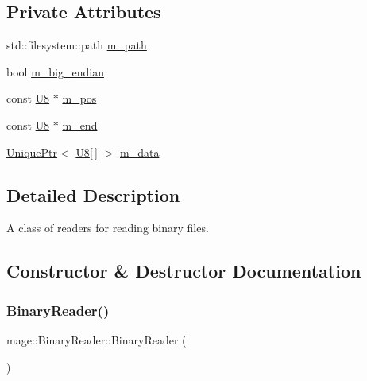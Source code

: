 \subsection*{Private Attributes}
\begin{DoxyCompactItemize}
\item 
std\+::filesystem\+::path \mbox{\hyperlink{classmage_1_1_binary_reader_a0941e624c8386fee2e2e92c6d1efdb75}{m\+\_\+path}}
\item 
bool \mbox{\hyperlink{classmage_1_1_binary_reader_a8d23fde958e08efe248edb5d92861113}{m\+\_\+big\+\_\+endian}}
\item 
const \mbox{\hyperlink{namespacemage_a30677c03d683c4c35630c25f6ff3fb7f}{U8}} $\ast$ \mbox{\hyperlink{classmage_1_1_binary_reader_aedb9632de1cf95d5af49499217744ed5}{m\+\_\+pos}}
\item 
const \mbox{\hyperlink{namespacemage_a30677c03d683c4c35630c25f6ff3fb7f}{U8}} $\ast$ \mbox{\hyperlink{classmage_1_1_binary_reader_a19b0f36cb1e8a05aaa9471514242e8ef}{m\+\_\+end}}
\item 
\mbox{\hyperlink{namespacemage_a3316d7143a973e37adf1110f2e80ca31}{Unique\+Ptr}}$<$ \mbox{\hyperlink{namespacemage_a30677c03d683c4c35630c25f6ff3fb7f}{U8}}\mbox{[}$\,$\mbox{]} $>$ \mbox{\hyperlink{classmage_1_1_binary_reader_a529bdcb620e1250aa0b12716c9b7eae1}{m\+\_\+data}}
\end{DoxyCompactItemize}


\subsection{Detailed Description}
A class of readers for reading binary files. 

\subsection{Constructor \& Destructor Documentation}
\mbox{\label{classmage_1_1_binary_reader_aab82579cef4f2f022273cf1adfcc8497}} 
\subsubsection{\texorpdfstring{Binary\+Reader()}{BinaryReader()}\hspace{0.1cm}{\footnotesize\ttfamily [1/3]}}
{\footnotesize\ttfamily mage\+::\+Binary\+Reader\+::\+Binary\+Reader (\begin{DoxyParamCaption}{ }\end{DoxyParamCaption})\hspace{0.3cm}{\ttfamily [protected]}}


